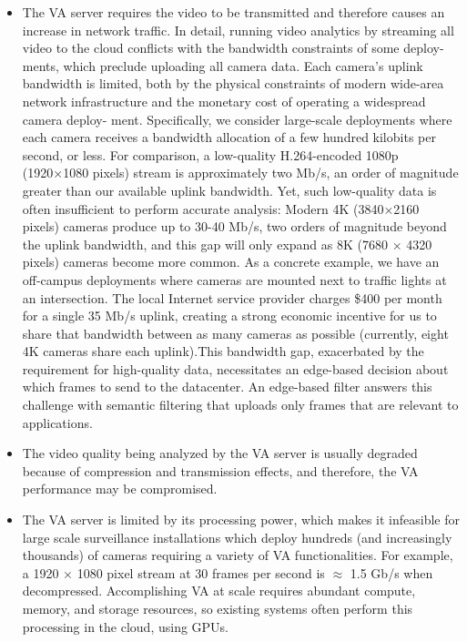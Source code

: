 \begin{itemize}
\item The VA server requires the video to be transmitted and therefore causes an increase in network traffic. In detail, running video analytics by streaming all video to the cloud conflicts with the bandwidth constraints of some deploy-
ments, which preclude uploading all camera data. Each camera’s uplink bandwidth is limited, both by the physical constraints of modern wide-area network infrastructure and the monetary cost of operating a widespread camera deploy-
ment. Specifically, we consider large-scale deployments where each camera receives a bandwidth allocation of a few hundred kilobits per second, or less. For comparison, a low-quality H.264-encoded 1080p (1920×1080 pixels) stream is approximately two Mb/s, an order of magnitude greater than our available uplink bandwidth. Yet, such low-quality data is often insufficient to perform accurate analysis: Modern 4K (3840×2160 pixels) cameras produce up to 30-40 Mb/s, two
orders of magnitude beyond the uplink bandwidth, and this
gap will only expand as 8K (7680 × 4320 pixels) cameras become more common. As a concrete example, we have an off-campus deployments where cameras are mounted next
to traffic lights at an intersection. The local Internet service provider charges \$400 per month for a single 35 Mb/s uplink, creating a strong economic incentive for us to share that bandwidth between as many cameras as possible (currently,
eight 4K cameras share each uplink).This bandwidth gap, exacerbated by the requirement for high-quality data, necessitates an edge-based decision about
which frames to send to the datacenter. An edge-based filter answers this challenge with semantic filtering that uploads only frames that are relevant to applications.
\item The video quality being analyzed by the VA server is usually degraded because of compression and transmission effects, and therefore, the VA performance may be compromised.
\item The VA server is limited by its processing power, which makes it infeasible for large scale surveillance installations which deploy hundreds (and increasingly thousands) of cameras requiring a variety of VA functionalities. For example, a 1920 × 1080 pixel stream at 30 frames per second is $\approx$ 1.5 Gb/s when decompressed. Accomplishing VA at scale requires abundant compute, memory, and storage resources, so existing systems often perform this processing in the cloud, using GPUs.
\end{itemize}

